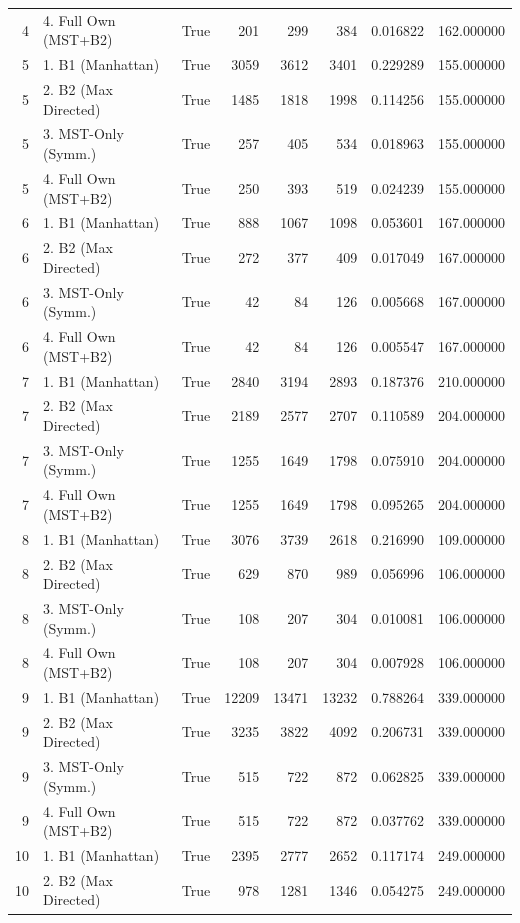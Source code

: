 \begin{table}[htbp]
\begin{tabular}{rlrrrrrr}
4 & 4. Full Own (MST+B2) & True & 201 & 299 & 384 & 0.016822 & 162.000000 \\
5 & 1. B1 (Manhattan) & True & 3059 & 3612 & 3401 & 0.229289 & 155.000000 \\
5 & 2. B2 (Max Directed) & True & 1485 & 1818 & 1998 & 0.114256 & 155.000000 \\
5 & 3. MST-Only (Symm.) & True & 257 & 405 & 534 & 0.018963 & 155.000000 \\
5 & 4. Full Own (MST+B2) & True & 250 & 393 & 519 & 0.024239 & 155.000000 \\
6 & 1. B1 (Manhattan) & True & 888 & 1067 & 1098 & 0.053601 & 167.000000 \\
6 & 2. B2 (Max Directed) & True & 272 & 377 & 409 & 0.017049 & 167.000000 \\
6 & 3. MST-Only (Symm.) & True & 42 & 84 & 126 & 0.005668 & 167.000000 \\
6 & 4. Full Own (MST+B2) & True & 42 & 84 & 126 & 0.005547 & 167.000000 \\
7 & 1. B1 (Manhattan) & True & 2840 & 3194 & 2893 & 0.187376 & 210.000000 \\
7 & 2. B2 (Max Directed) & True & 2189 & 2577 & 2707 & 0.110589 & 204.000000 \\
7 & 3. MST-Only (Symm.) & True & 1255 & 1649 & 1798 & 0.075910 & 204.000000 \\
7 & 4. Full Own (MST+B2) & True & 1255 & 1649 & 1798 & 0.095265 & 204.000000 \\
8 & 1. B1 (Manhattan) & True & 3076 & 3739 & 2618 & 0.216990 & 109.000000 \\
8 & 2. B2 (Max Directed) & True & 629 & 870 & 989 & 0.056996 & 106.000000 \\
8 & 3. MST-Only (Symm.) & True & 108 & 207 & 304 & 0.010081 & 106.000000 \\
8 & 4. Full Own (MST+B2) & True & 108 & 207 & 304 & 0.007928 & 106.000000 \\
9 & 1. B1 (Manhattan) & True & 12209 & 13471 & 13232 & 0.788264 & 339.000000 \\
9 & 2. B2 (Max Directed) & True & 3235 & 3822 & 4092 & 0.206731 & 339.000000 \\
9 & 3. MST-Only (Symm.) & True & 515 & 722 & 872 & 0.062825 & 339.000000 \\
9 & 4. Full Own (MST+B2) & True & 515 & 722 & 872 & 0.037762 & 339.000000 \\
10 & 1. B1 (Manhattan) & True & 2395 & 2777 & 2652 & 0.117174 & 249.000000 \\
10 & 2. B2 (Max Directed) & True & 978 & 1281 & 1346 & 0.054275 & 249.000000 \\

\end{tabular}
\end{table}
